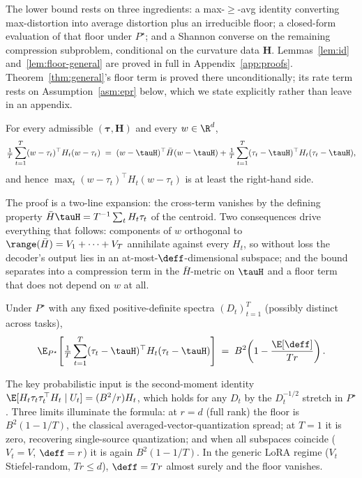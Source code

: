 The lower bound rests on three ingredients: a max-$\geq$-avg identity
converting max-distortion into average distortion plus an irreducible
floor; a closed-form evaluation of that floor under $P^\star$; and a
Shannon converse on the remaining compression subproblem, conditional
on the curvature data $\boldsymbol H$. Lemmas~\ref{lem:id}
and~\ref{lem:floor-general} are proved in full in
Appendix~\ref{app:proofs}. Theorem~\ref{thm:general}'s floor term is proved
there unconditionally; its rate term rests on Assumption~\ref{asm:epr} below,
which we state explicitly rather than leave in an appendix.

\begin{lemma}\label{lem:id}
For every admissible $(\boldsymbol\tau, \boldsymbol H)$ and every
$w\in\R^d$,
\begin{equation}\label{eq:id-eq}
  \tfrac1T\sum_{t=1}^T (w-\tau_t)^\top H_t (w-\tau_t)
  \;=\; (w-\tauH)^\top\bar H(w-\tauH) + \tfrac1T\sum_{t=1}^T
  (\tau_t-\tauH)^\top H_t (\tau_t-\tauH),
\end{equation}
and hence $\max_t (w-\tau_t)^\top H_t(w-\tau_t)$ is at least the
right-hand side.
\end{lemma}

The proof is a two-line expansion: the cross-term vanishes by the
defining property $\bar H\tauH = T^{-1}\sum_t H_t\tau_t$ of the
centroid. Two consequences drive everything that follows: components
of $w$ orthogonal to $\range(\bar H) = V_1+\cdots+V_T$ annihilate
against every $H_t$, so without loss the decoder's output lies in an
at-most-$\deff$-dimensional subspace; and the bound separates into a
compression term in the $\bar H$-metric on $\tauH$ and a floor term
that does not depend on $w$ at all.

\begin{lemma}\label{lem:floor-general}
Under $P^\star$ with any fixed positive-definite spectra
$(D_t)_{t=1}^T$ (possibly distinct across tasks),
\begin{equation}\label{eq:floor-closed}
  \E_{P^\star}\!\left[\tfrac1T\sum_{t=1}^T(\tau_t-\tauH)^\top
   H_t(\tau_t-\tauH)\right]
  \;=\; B^2\!\left(1 - \frac{\E[\deff]}{Tr}\right).
\end{equation}
\end{lemma}

The key probabilistic input is the second-moment identity
$\E[H_t\tau_t\tau_t^\top H_t\mid U_t] = (B^2/r) H_t$, which holds for
any $D_t$ by the $D_t^{-1/2}$ stretch in $P^\star$. Three limits
illuminate the formula: at $r = d$ (full rank) the floor is
$B^2(1 - 1/T)$, the classical averaged-vector-quantization spread; at
$T = 1$ it is zero, recovering single-source quantization; and when
all subspaces coincide ($V_t = V$, $\deff = r$) it is again
$B^2(1 - 1/T)$. In the generic LoRA regime ($V_t$ Stiefel-random,
$Tr \leq d$), $\deff = Tr$ almost surely and the floor vanishes.


